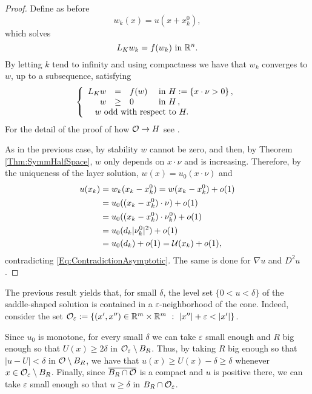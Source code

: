 \begin{proof}
Define as before
$$ w_k (x) = u(x+x_k^0), $$
which solves
$$ L_K  w_k = f(w_k) \ \text{in } \mathbb{R}^n. $$
By letting $k$ tend to infinity and using compactness  we have that $w_k$ converges to $w$, up to a subsequence, satisfying
$$
\beqc{\PDEsystem}
L_K  w &=& f(w)  &\textrm{ in } H:=\{x\cdot \nu >0\}\,,\\
w &\geq& 0  &\textrm{ in } H\,,\\
\,\,w \text{ odd with respect to } H. \span\span\span \,
\eeqc
$$
For the detail of the proof of how $\mathcal{O} \rightarrow H$ see \cite{CabreTerra1}.

As in the previous case, by stability $w$ cannot be zero, and then, by Theorem \ref{Thm:SymmHalfSpace}, $w$ only depends on $x\cdot \nu$ and is increasing. Therefore, by the uniqueness of the layer solution, $w(x) = u_0(x\cdot \nu)$ and
\begin{align*}
u(x_k) &= w_k(x_k-x_k^0) = w(x_k-x_k^0) + o(1) \\
&= u_0((x_k-x_k^0)\cdot \nu) + o(1) \\
&= u_0((x_k-x_k^0)\cdot \nu_k^0) + o(1) \\
&= u_0(d_k |\nu_k^0|^2) + o(1) \\
&= u_0(d_k) + o(1) = \mathcal{U} (x_k) + o(1),
\end{align*}
contradicting \eqref{Eq:ContradictionAsymptotic}. The same is done for $\nabla u$ and $D^2 u$.
\end{proof}

\begin{remark}
	The previous result yields that, for small $\delta$, the level set $\{0<u<\delta\}$ of the saddle-shaped solution is contained in a $\varepsilon$-neighborhood of the cone. Indeed, consider the set $\ocal_\varepsilon := \{(x',x'')\in \R^m\times\R^m \ : \ |x''|+\varepsilon <|x'| \}$. 
	
	Since $u_0$ is monotone, for every small $\delta$ we can take $\varepsilon$ small enough and $R$ big enough so that $U(x)\geq 2\delta$ in $\mathcal{O}_\varepsilon \setminus B_R$. Thus, by taking $R$ big enough so that $|u-U|< \delta$ in $\mathcal{O} \setminus B_R$, we have that $u(x) \geq U(x)-\delta \geq \delta$ whenever $x\in \mathcal{O}_\varepsilon \setminus B_R$. Finally, since $\overline{B_R \cap \mathcal{O}}$ is a compact and $u$ is positive there, we can take $\varepsilon$ small enough so that $u\geq \delta$ in $B_R\cap \mathcal{O}_\varepsilon$.
\end{remark}